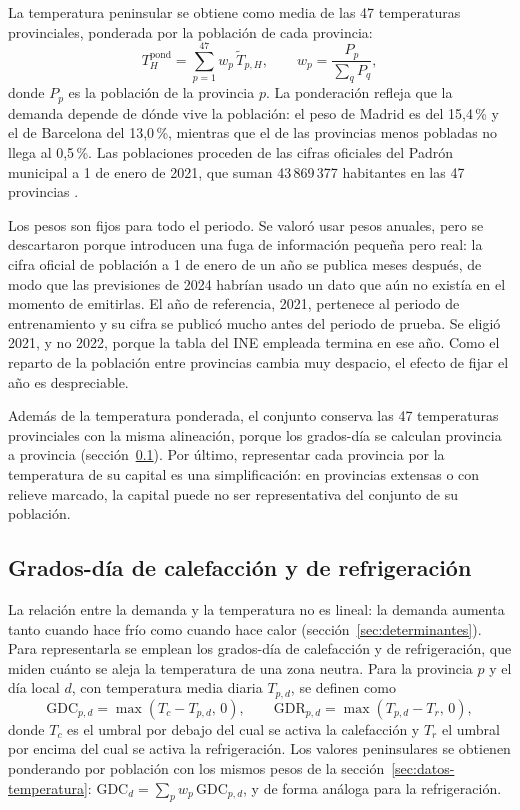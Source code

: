 La temperatura peninsular se obtiene como media de las 47 temperaturas
provinciales, ponderada por la población de cada provincia:
\begin{equation}
	T^{\mathrm{pond}}_H = \sum_{p=1}^{47} w_p \, \tilde{T}_{p,H},
	\qquad w_p = \frac{P_p}{\sum_{q} P_q},
\end{equation}
donde $P_p$ es la población de la provincia $p$. La ponderación refleja que
la demanda depende de dónde vive la población: el peso de Madrid es del
15,4\,\% y el de Barcelona del 13,0\,\%, mientras que el de las provincias
menos pobladas no llega al 0,5\,\%. Las poblaciones proceden de las cifras
oficiales del Padrón municipal a 1 de enero de 2021, que suman
43\,869\,377 habitantes en las 47 provincias \parencite{ine2021tabla2852}.

Los pesos son fijos para todo el periodo. Se valoró usar pesos anuales, pero
se descartaron porque introducen una fuga de información pequeña pero real:
la cifra oficial de población a 1 de enero de un año se publica meses
después, de modo que las previsiones de 2024 habrían usado un dato que aún no
existía en el momento de emitirlas. El año de referencia, 2021, pertenece al
periodo de entrenamiento y su cifra se publicó mucho antes del periodo de
prueba. Se eligió 2021, y no 2022, porque la tabla del INE empleada termina
en ese año. Como el reparto de la población entre provincias cambia muy
despacio, el efecto de fijar el año es despreciable.

Además de la temperatura ponderada, el conjunto conserva las 47
temperaturas provinciales con la misma alineación, porque los grados-día se
calculan provincia a provincia (sección~\ref{sec:datos-gradosdia}). Por
último, representar cada provincia por la temperatura de su capital es una
simplificación: en provincias extensas o con relieve marcado, la capital
puede no ser representativa del conjunto de su población.

\subsection{Grados-día de calefacción y de refrigeración}\label{sec:datos-gradosdia}

La relación entre la demanda y la temperatura no es lineal: la demanda
aumenta tanto cuando hace frío como cuando hace calor
(sección~\ref{sec:determinantes}). Para representarla se emplean los
grados-día de calefacción y de refrigeración, que miden cuánto se aleja la
temperatura de una zona neutra. Para la provincia $p$ y el día local $d$,
con temperatura media diaria $T_{p,d}$, se definen como
\begin{equation}
	\mathrm{GDC}_{p,d} = \max\left(T_c - T_{p,d},\, 0\right),
	\qquad
	\mathrm{GDR}_{p,d} = \max\left(T_{p,d} - T_r,\, 0\right),
\end{equation}
donde $T_c$ es el umbral por debajo del cual se activa la calefacción y
$T_r$ el umbral por encima del cual se activa la refrigeración. Los valores
peninsulares se obtienen ponderando por población con los mismos pesos de la
sección~\ref{sec:datos-temperatura}:
$\mathrm{GDC}_d = \sum_p w_p \, \mathrm{GDC}_{p,d}$, y de forma análoga para
la refrigeración.


